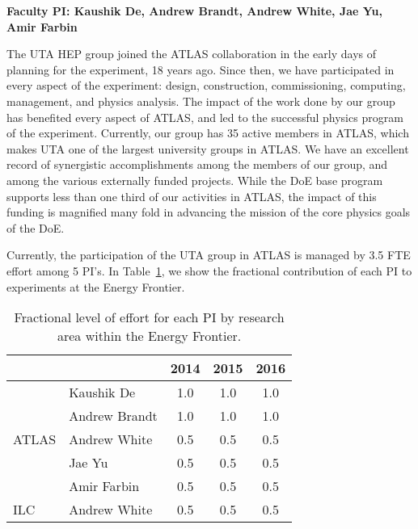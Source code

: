 
\textbf{Faculty PI: Kaushik De, Andrew Brandt, Andrew White, Jae Yu, Amir Farbin}

The UTA HEP group joined the ATLAS collaboration in the early days of planning for the experiment, 18 years ago. Since then, we have participated in every aspect of the experiment: design, construction, commissioning, computing, management, and physics analysis. The impact of the work done by our group has benefited every aspect of ATLAS, and led to the successful physics program of the experiment. Currently, our group has 35 active members in ATLAS, which makes UTA one of the largest university groups in ATLAS. We have an excellent record of synergistic accomplishments among the members of our group, and among the various externally funded projects. While the DoE base program supports less than one third of our activities in ATLAS, the impact of this funding is magnified many fold in advancing the mission of the core physics goals of the DoE.

Currently, the participation of the UTA group in ATLAS is managed by 3.5 FTE effort among 5 PI's. In Table~\ref{table:atlas-intro}, we show the fractional contribution of each PI to experiments at the Energy Frontier.

\begin{table}[htb]
\centering
\begin{tabular}{ l | l | c | c | c }
\hline \hline
\multicolumn{2}{c|}{} & 2014 & 2015 & 2016 \\ \hline
\multirow{5}{*}{ATLAS} & Kaushik De & 1.0 & 1.0 & 1.0 \\ \cline{2-5}
 & Andrew Brandt & 1.0 & 1.0 & 1.0 \\ \cline{2-5}
 & Andrew White & 0.5 & 0.5 & 0.5 \\ \cline{2-5}
 & Jae Yu & 0.5 & 0.5 & 0.5 \\ \cline{2-5}
 & Amir Farbin & 0.5 & 0.5 & 0.5 \\ \hline
ILC & Andrew White & 0.5 & 0.5 & 0.5 \\ \hline  \hline
\end{tabular}
\caption{Fractional level of effort for each PI by research area within the Energy Frontier.}
\label{table:atlas-intro}
\end{table}
